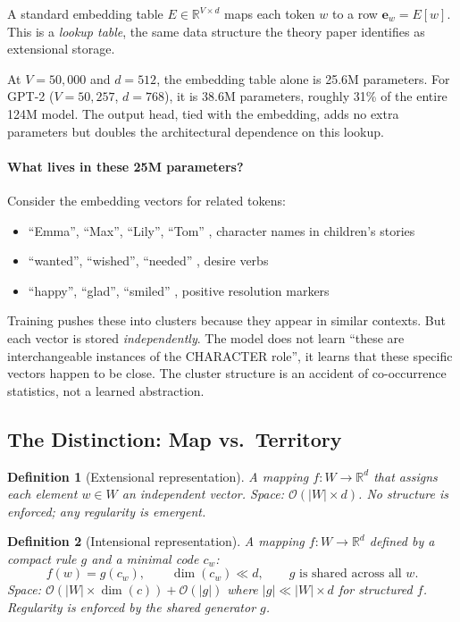 \documentclass[11pt, a4paper]{article}
\newcommand{\R}{\mathbb{R}}
\newcommand{\bigO}{\mathcal{O}}
\newtheorem{definition}{Definition}
\theoremstyle{remark}
\begin{document}
A standard embedding table $E \in \R^{V \times d}$ maps each token $w$ to a row $\mathbf{e}_w = E[w]$.
This is a \emph{lookup table}, the same data structure the theory paper identifies as extensional storage.

At $V = 50{,}000$ and $d = 512$, the embedding table alone is 25.6M parameters.
For GPT-2 ($V = 50{,}257$, $d = 768$), it is 38.6M parameters, roughly 31\% of the entire 124M model.
The output head, tied with the embedding, adds no extra parameters but doubles the architectural dependence on this lookup.

\paragraph{What lives in these 25M parameters?}
Consider the embedding vectors for related tokens:
\begin{itemize}[nosep]
    \item ``Emma'', ``Max'', ``Lily'', ``Tom'' ,  character names in children's stories
    \item ``wanted'', ``wished'', ``needed'' ,  desire verbs
    \item ``happy'', ``glad'', ``smiled'' ,  positive resolution markers
\end{itemize}

Training pushes these into clusters because they appear in similar contexts.
But each vector is stored \emph{independently}.
The model does not learn ``these are interchangeable instances of the CHARACTER role'', it learns that these specific vectors happen to be close.
The cluster structure is an accident of co-occurrence statistics, not a learned abstraction.

\subsection{The Distinction: Map vs.\ Territory}

\begin{definition}[Extensional representation]
A mapping $f: W \to \R^d$ that assigns each element $w \in W$ an independent vector.
Space: $\bigO(|W| \times d)$.
No structure is enforced; any regularity is emergent.
\end{definition}

\begin{definition}[Intensional representation]
A mapping $f: W \to \R^d$ defined by a compact rule $g$ and a minimal code $c_w$:
\[
    f(w) = g(c_w), \qquad \dim(c_w) \ll d, \qquad g \text{ is shared across all } w.
\]
Space: $\bigO(|W| \times \dim(c)) + \bigO(|g|)$ where $|g| \ll |W| \times d$ for structured $f$.
Regularity is enforced by the shared generator $g$.
\end{definition}
\end{document}
